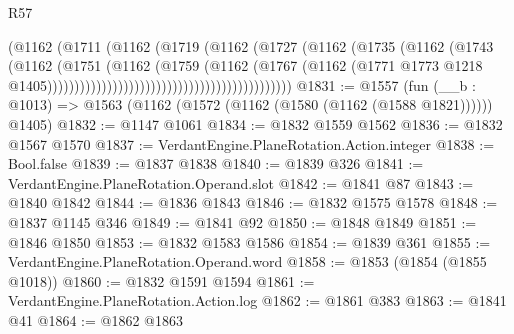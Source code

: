 \begin{lexlean}{R57}
\begin{coremodule}
                                                          (@1162
                                                            (@1711
                                                              (@1162
                                                                (@1719
                                                                  (@1162
                                                                    (@1727
                                                                      (@1162
                                                                        (@1735
                                                                          (@1162
                                                                            (@1743
                                                                              (@1162
                                                                                (@1751
                                                                                  (@1162
                                                                                    (@1759
                                                                                      (@1162
                                                                                        (@1767
                                                                                          (@1162
                                                                                            (@1771
                                                                                              @1773
                                                                                              @1218
                                                                                              @1405)))))))))))))))))))))))))))))))))))))))))))))
@1831 := @1557
    (fun (__b : @1013) => @1563 (@1162 (@1572 (@1162 (@1580 (@1162 (@1588 @1821)))))) @1405)
@1832 := @1147 @1061
@1834 := @1832 @1559 @1562
@1836 := @1832 @1567 @1570
@1837 := VerdantEngine.PlaneRotation.Action.integer
@1838 := Bool.false
@1839 := @1837 @1838
@1840 := @1839 @326
@1841 := VerdantEngine.PlaneRotation.Operand.slot
@1842 := @1841 @87
@1843 := @1840 @1842
@1844 := @1836 @1843
@1846 := @1832 @1575 @1578
@1848 := @1837 @1145 @346
@1849 := @1841 @92
@1850 := @1848 @1849
@1851 := @1846 @1850
@1853 := @1832 @1583 @1586
@1854 := @1839 @361
@1855 := VerdantEngine.PlaneRotation.Operand.word
@1858 := @1853 (@1854 (@1855 @1018))
@1860 := @1832 @1591 @1594
@1861 := VerdantEngine.PlaneRotation.Action.log
@1862 := @1861 @383
@1863 := @1841 @41
@1864 := @1862 @1863

\end{coremodule}
\end{lexlean}

